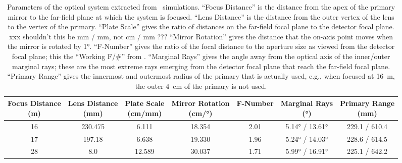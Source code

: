 \begin{table}
\centering
\caption[Parameters of the optical system extracted from \ZEMAX\ simulations]{
  Parameters of the optical system extracted from \ZEMAX\ simulations.
  ``Focus Distance'' is the distance from the apex of the primary mirror to the far-field plane at which the system is focused.
  ``Lens Distance'' is the distance from the outer vertex of the lens to the vertex of the primary.
  ``Plate Scale'' gives the ratio of distances on the far-field focal plane to the detector focal plane.
  xxx shouldn't this be mm / mm, not cm / mm ???
  ``Mirror Rotation'' gives the distance that the on-axis point moves when the mirror is rotated by \ang{1}.
  ``F-Number'' gives the ratio of the focal distance to the aperture size as viewed from the detector focal plane; this the ``Working F/\#'' from \ZEMAX.
  ``Marginal Rays'' gives the angle away from the optical axis of the inner/outer marginal rays; these are the most extreme rays emerging from the detector focal plane that reach the far-field focal plane.
  ``Primary Range'' gives the innermost and outermost radius of the primary that is actually used, e.g., when focused at \SI{16}{\m}, the outer \SI{4}{\cm} of the primary is not used.
}
\label{tab:ch4-zemax-parms}
\begin{tabular}{ccccccc}
\toprule
  \specialcell{Focus Distance \\ (\si{\m})} &
  \specialcell{Lens Distance \\ (\si{\mm})} &
  \specialcell{Plate Scale \\ (\si{\cm}/\si{\mm})} &
  \specialcell{Mirror Rotation \\ (\si{\cm}/\si{\degree})} &
  \specialcell{F-Number  \\ } & 
  \specialcell{Marginal Rays \\ (\si{\degree})} &
  \specialcell{Primary Range \\ (\si{\mm})} \\
\midrule
16 & 230.475 &  6.111 & 18.354 & 2.01 &  \ang{5.14} / \ang{13.61} & 229.1 / 610.4 \\
17 & 197.18  &  6.638 & 19.330 & 1.96 &  \ang{5.24} / \ang{14.03} & 228.6 / 614.5 \\ 
28 &   8.0   & 12.589 & 30.037 & 1.71 &  \ang{5.99} / \ang{16.91} & 225.1 / 642.2 \\
\bottomrule
\end{tabular}
\end{table}

